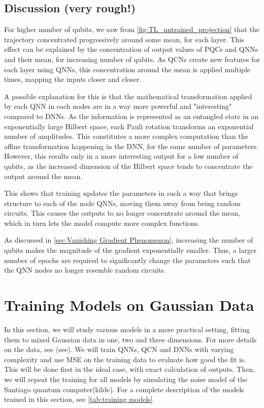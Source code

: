 \subsection{Discussion (very rough!)}\label{sec:Discussion Expressivity}

For higher number of qubits, we saw from \autoref{fig:TL_untrained_projection} that the trajectory concentrated progressively around some mean, for each layer. This effect can be explained by the concentration of output values of PQCs and QNNs and their mean, for increasing number of qubits. As QCNs create new features for each layer using QNNs, this concentration around the mean is applied multiple times, mapping the inputs closer and closer. 

A possible explanation for this is that the mathematical transformation applied by each QNN in each nodes are in a way more powerful and "interesting" compared to DNNs. As the information is represented as an entangled state in an exponentially large Hilbert space, each Pauli rotation transforms an exponential number of amplitudes. This constitutes a more complex computation than the affine transformation happening in the DNN, for the same number of parameters. However, this results only in a more interesting output for a low number of qubits, as the increased dimension of the Hilbert space tends to concentrate the output around the mean. 

This shows that training updates the parameters in such a way that brings structure to each of the node QNNs, moving them away from being random circuits. This causes the outputs to no longer concentrate around the mean, which in turn lets the model compute more complex functions.

As discussed in \autoref{sec:Vanishing Gradient Phenomenon}, increasing the number of qubits makes the magnitude of the gradient exponentially smaller. Thus, a larger number of epochs are required to significantly change the parameters such that the QNN nodes no longer resemble random circuits.

\section{Training Models on Gaussian Data}\label{sec:Training Models}
In this section, we will study various models in a more practical setting, fitting them to mixed Gaussian data in one, two and three dimensions. For more details on the data, see (see). We will train QNNs, QCN and DNNs with varying complexity and use MSE on the training data to evaluate how good the fit is. This will be done first in the ideal case, with exact calculation of outputs. Then, we will repeat the training for all models by simulating the noise model of the Santiago quantum computer(kilde). For a complete description of the models trained in this section, see \autoref{tab:training models}.

